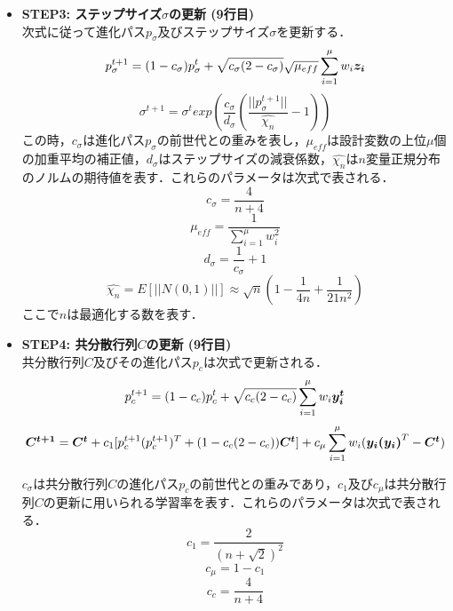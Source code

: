 \documentclass[a4j,11pt]{jarticle}
\begin{document}
\begin{itemize}
\item {\bf STEP3: ステップサイズ$\sigma$の更新 (9行目)} \\
次式に従って進化パス$p_{\sigma}$及びステップサイズ$\sigma$を更新する．
\begin{equation}
\label{eq:cmaes-ps}
p_{\sigma}^{t+1}=(1-c_{\sigma})p_{\sigma}^t+\sqrt{c_{\sigma}(2-c_{\sigma})}\sqrt{\mu_{eff}}\sum_{i=1}^{\mu}w_i \mbox{\boldmath $z_i$}
\end{equation}
\begin{equation}
\label{eq:cmaes-s}
\sigma^{t+1}=\sigma^t exp(\frac{c_{\sigma}}{d_{\sigma}}(\frac{||p_{\sigma}^{t+1}||}{\hat{\chi_n}}-1))
\end{equation}
この時，$c_{\sigma}$は進化パス$p_{\sigma}$の前世代との重みを表し，$\mu_{eff}$は設計変数の上位$\mu$個の加重平均の補正値，$d_{\sigma}$はステップサイズの減衰係数，$\hat{\chi_n}$は$n$変量正規分布のノルムの期待値を表す．これらのパラメータは次式で表される．
\begin{equation}
\label{eq:cmaes-csig}
c_{\sigma}=\frac{4}{n+4}
\end{equation}
\begin{equation}
\label{eq:cmaes-mu-eff}
\mu_{eff}=\frac{1}{\sum_{i=1}^{\mu}w_i^2}
\end{equation}
\begin{equation}
\label{eq:cmaes-d}
d_{\sigma}=\frac{1}{c_{\sigma}}+1
\end{equation}
\begin{equation}
\label{eq:cmaes-chi}
\hat{\chi_n}=E[||N(0,1)||] \approx \sqrt{n}(1-\frac{1}{4n}+\frac{1}{21n^2})
\end{equation}
ここで$n$は最適化する数を表す．

\item {\bf STEP4: 共分散行列$C$の更新 (9行目)} \\
共分散行列$C$及びその進化パス$p_c$は次式で更新される．
\begin{equation}
\label{eq:cmaes-pc}
p_c^{t+1}=(1-c_c)p_c^t+\sqrt{c_c(2-c_c)} \sum_{i=1}^{\mu}w_i \mbox{\boldmath $y_i^t$}
\end{equation}
\begin{equation}
\label{eq:cmaes-c}
\mbox{\boldmath $C^{t+1}$}=\mbox{\boldmath $C^t$}+c_1[p_c^{t+1}(p_c^{t+1})^T+(1-c_c(2-c_c))\mbox{\boldmath $C^t$}]+c_{\mu}\sum_{i=1}^{\mu}w_i(\mbox{\boldmath $y_i(y_i)$}^T-\mbox{\boldmath $C^t$})
\end{equation}


$c_{\sigma}$は共分散行列$C$の進化パス$p_c$の前世代との重みであり，$c_1$及び$c_{\mu}$は共分散行列$C$の更新に用いられる学習率を表す．これらのパラメータは次式で表される．
\begin{equation}
\label{eq:cmaes-c1}
c_{1}=\frac{2}{(n+\sqrt{2})^2}
\end{equation}
\begin{equation}
\label{eq:cmaes-cmu}
c_{\mu}=1-c_1
\end{equation}
\begin{equation}
\label{eq:cmaes-cc}
c_c=\frac{4}{n+4}
\end{equation}

\end{itemize}
\end{document}
